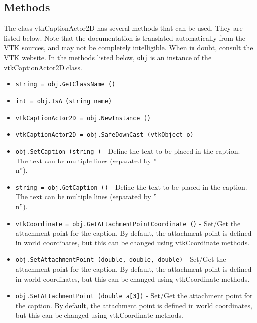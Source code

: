 \subsection{Methods}

The class vtkCaptionActor2D has several methods that can be used.
  They are listed below.
Note that the documentation is translated automatically from the VTK sources,
and may not be completely intelligible.  When in doubt, consult the VTK website.
In the methods listed below, \verb|obj| is an instance of the vtkCaptionActor2D class.
\begin{itemize}
\item  \verb|string = obj.GetClassName ()|

\item  \verb|int = obj.IsA (string name)|

\item  \verb|vtkCaptionActor2D = obj.NewInstance ()|

\item  \verb|vtkCaptionActor2D = obj.SafeDownCast (vtkObject o)|

\item  \verb|obj.SetCaption (string )| -  Define the text to be placed in the caption. The text can be multiple
 lines (separated by ''\\n'').

\item  \verb|string = obj.GetCaption ()| -  Define the text to be placed in the caption. The text can be multiple
 lines (separated by ''\\n'').

\item  \verb|vtkCoordinate = obj.GetAttachmentPointCoordinate ()| -  Set/Get the attachment point for the caption. By default, the attachment
 point is defined in world coordinates, but this can be changed using
 vtkCoordinate methods.

\item  \verb|obj.SetAttachmentPoint (double, double, double)| -  Set/Get the attachment point for the caption. By default, the attachment
 point is defined in world coordinates, but this can be changed using
 vtkCoordinate methods.

\item  \verb|obj.SetAttachmentPoint (double a[3])| -  Set/Get the attachment point for the caption. By default, the attachment
 point is defined in world coordinates, but this can be changed using
 vtkCoordinate methods.


\end{itemize}
